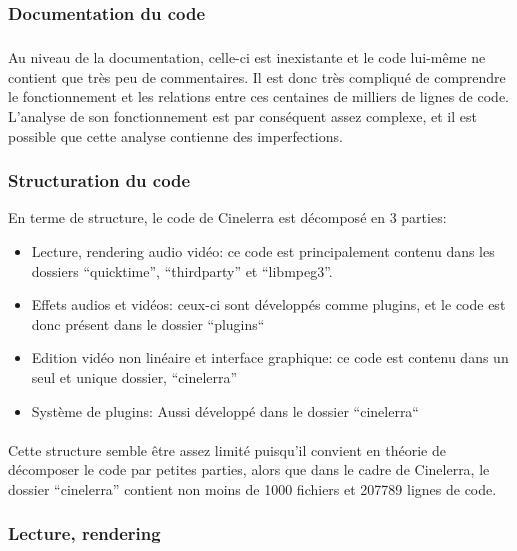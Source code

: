 \subsubsection{Documentation du code}

\subparagraph{}

Au niveau de la documentation, celle-ci est inexistante et le code
lui-même ne contient que très peu de commentaires. Il est donc très
compliqué de comprendre le fonctionnement et les relations entre ces
centaines de milliers de lignes de code. L'analyse de son fonctionnement
est par conséquent assez complexe, et il est possible que cette analyse
contienne des imperfections.

\subsubsection {Structuration du code}

En terme de structure, le code de Cinelerra est décomposé en 3 parties:

\begin{itemize}

  \item{Lecture, rendering  audio vidéo: ce code est principalement
    contenu dans les dossiers ``quicktime'', ``thirdparty'' et
    ``libmpeg3''.}

  \item{Effets audios et vidéos: ceux-ci sont développés comme plugins,
    et le code est donc présent dans le dossier ``plugins`` }

  \item{Edition vidéo non linéaire et interface graphique: ce code est
    contenu dans un seul et unique dossier, ``cinelerra''}

  \item{Système de plugins: Aussi développé dans le dossier
  ``cinelerra``}

\end{itemize}

\paragraph{}

Cette structure semble être assez limité puisqu'il convient en théorie
de décomposer le code par petites parties, alors que dans le cadre de
Cinelerra, le dossier ``cinelerra'' contient non  moins de 1000 fichiers
et 207789 lignes de code.

\subsubsection{Lecture, rendering}

